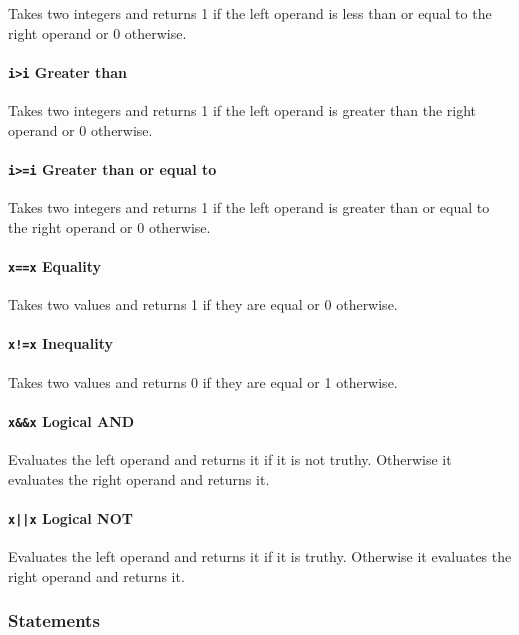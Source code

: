 \documentclass[12pt, a4paper]{article}
\begin{document}
Takes two integers and returns 1 if the left operand is less than or equal to the right operand or 0 otherwise.

\paragraph{\texttt{i>i} \quad Greater than}

Takes two integers and returns 1 if the left operand is greater than the right operand or 0 otherwise.

\paragraph{\texttt{i>=i} \quad Greater than or equal to}

Takes two integers and returns 1 if the left operand is greater than or equal to the right operand or 0 otherwise.

\paragraph{\texttt{x==x} \quad Equality}

Takes two values and returns 1 if they are equal or 0 otherwise.

\paragraph{\texttt{x!=x} \quad Inequality}

Takes two values and returns 0 if they are equal or 1 otherwise.

\paragraph{\texttt{x\&\&x} \quad Logical AND}

Evaluates the left operand and returns it if it is not truthy. Otherwise it evaluates the right operand and returns it.

\paragraph{\texttt{x||x} \quad Logical NOT}

Evaluates the left operand and returns it if it is truthy. Otherwise it evaluates the right operand and returns it.

\subsubsection{Statements}
\end{document}

